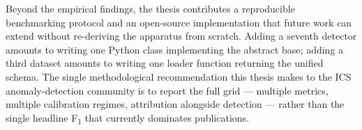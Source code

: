 Beyond the empirical findings, the thesis contributes a reproducible benchmarking protocol and an open-source implementation that future work can extend without re-deriving the apparatus from scratch.  Adding a seventh detector amounts to writing one Python class implementing the abstract  base; adding a third dataset amounts to writing one loader function returning the unified schema.  The single methodological recommendation this thesis makes to the ICS anomaly-detection community is to report the full grid --- multiple metrics, multiple calibration regimes, attribution alongside detection --- rather than the single headline F\textsubscript{1} that currently dominates publications.
